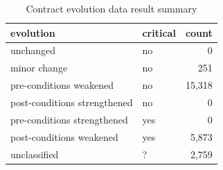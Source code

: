 \begin{table}[]
\centering
\caption{Contract evolution data result summary}
\label{tab:results-evolution}
\begin{tabular}{|l|l|r|} \hline
   evolution & critical & count \\ \hline
   unchanged & no & 0  \\
   minor change & no & 251  \\
   pre-conditions weakened & no & 15,318  \\
   post-conditions strengthened & no & 0  \\ \hline
   pre-conditions strengthened & yes & 0  \\
   post-conditions weakened & yes & 5,873  \\ \hline
   unclassified & ? & 2,759  \\ \hline
\end{tabular}
\end{table}
